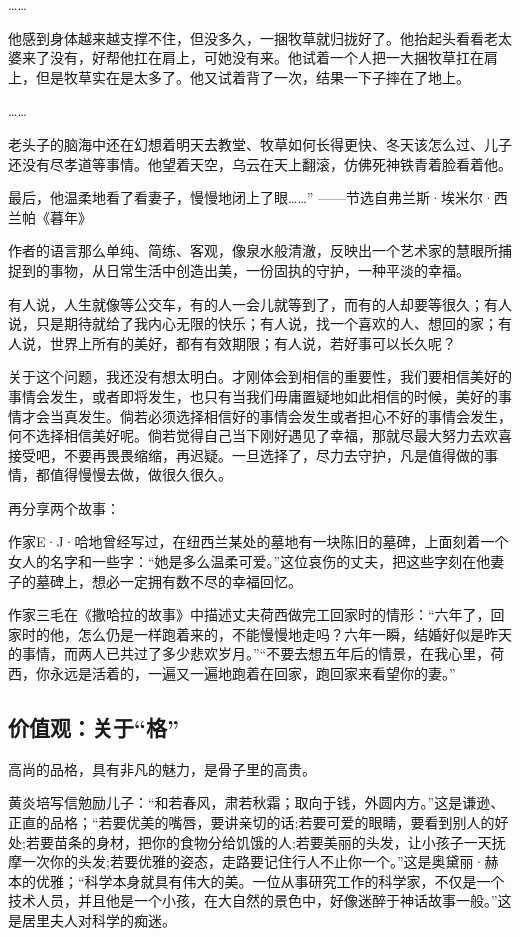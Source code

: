 \documentclass[openany,scheme = chinese, linespread = 1.5]{ctexbook}
\begin{document}
    ……
    
他感到身体越来越支撑不住，但没多久，一捆牧草就归拢好了。他抬起头看看老太婆来了没有，好帮他扛在肩上，可她没有来。他试着一个人把一大捆牧草扛在肩上，但是牧草实在是太多了。他又试着背了一次，结果一下子摔在了地上。

……

老头子的脑海中还在幻想着明天去教堂、牧草如何长得更快、冬天该怎么过、儿子还没有尽孝道等事情。他望着天空，乌云在天上翻滚，仿佛死神铁青着脸看着他。

最后，他温柔地看了看妻子，慢慢地闭上了眼……”
                      ——节选自弗兰斯·埃米尔·西兰帕《暮年》
                      
作者的语言那么单纯、简练、客观，像泉水般清澈，反映出一个艺术家的慧眼所捕捉到的事物，从日常生活中创造出美，一份固执的守护，一种平淡的幸福。

    有人说，人生就像等公交车，有的人一会儿就等到了，而有的人却要等很久；有人说，只是期待就给了我内心无限的快乐；有人说，找一个喜欢的人、想回的家；有人说，世界上所有的美好，都有有效期限；有人说，若好事可以长久呢？
    
关于这个问题，我还没有想太明白。才刚体会到相信的重要性，我们要相信美好的事情会发生，或者即将发生，也只有当我们毋庸置疑地如此相信的时候，美好的事情才会当真发生。倘若必须选择相信好的事情会发生或者担心不好的事情会发生，何不选择相信美好呢。倘若觉得自己当下刚好遇见了幸福，那就尽最大努力去欢喜接受吧，不要再畏畏缩缩，再迟疑。一旦选择了，尽力去守护，凡是值得做的事情，都值得慢慢去做，做很久很久。

再分享两个故事：

作家E·J·哈地曾经写过，在纽西兰某处的墓地有一块陈旧的墓碑，上面刻着一个女人的名字和一些字：“她是多么温柔可爱。”这位哀伤的丈夫，把这些字刻在他妻子的墓碑上，想必一定拥有数不尽的幸福回忆。

作家三毛在《撒哈拉的故事》中描述丈夫荷西做完工回家时的情形：“六年了，回家时的他，怎么仍是一样跑着来的，不能慢慢地走吗？六年一瞬，结婚好似是昨天的事情，而两人已共过了多少悲欢岁月。”“不要去想五年后的情景，在我心里，荷西，你永远是活着的，一遍又一遍地跑着在回家，跑回家来看望你的妻。”

\subsection*{价值观：关于“格”}

    高尚的品格，具有非凡的魅力，是骨子里的高贵。
    
黄炎培写信勉励儿子：“和若春风，肃若秋霜；取向于钱，外圆内方。”这是谦逊、正直的品格；“若要优美的嘴唇，要讲亲切的话;若要可爱的眼睛，要看到别人的好处;若要苗条的身材，把你的食物分给饥饿的人;若要美丽的头发，让小孩子一天抚摩一次你的头发;若要优雅的姿态，走路要记住行人不止你一个。”这是奥黛丽·赫本的优雅；“科学本身就具有伟大的美。一位从事研究工作的科学家，不仅是一个技术人员，并且他是一个小孩，在大自然的景色中，好像迷醉于神话故事一般。”这是居里夫人对科学的痴迷。
\end{document}
